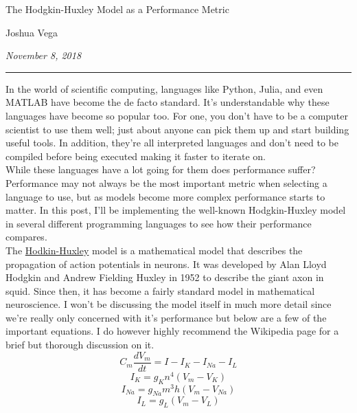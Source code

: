 \documentclass[12pt,letterpaper]{article}
\begin{document}
\begin{center}
  {\sc\Large The Hodgkin-Huxley Model as a Performance Metric\par}
  \vspace{1em}
  {\large Joshua Vega\par}
  \vspace{1em}
  {\it November 8, 2018\par}
\end{center}

\rule{\textwidth}{1pt}

\vspace{1.5em}

In the world of scientific computing, languages like Python, Julia, and even
MATLAB have become the de facto standard. It's understandable why these
languages have become so popular too. For one, you don't have to be a computer
scientist to use them well; just about anyone can pick them up and start
building useful tools. In addition, they're all interpreted languages and don't
need to be compiled before being executed making it faster to iterate on.\\

While these languages have a lot going for them does performance suffer?
Performance may not always be the most important metric when selecting a
language to use, but as models become more complex performance starts to matter.
In this post, I'll be implementing the well-known Hodgkin-Huxley model in
several different programming languages to see how their performance compares.\\

The
\href{https://en.wikipedia.org/wiki/Hodgkin-Huxley_model}{Hodkin-Huxley}
model is a mathematical model that describes the propagation of action
potentials in neurons. It was developed by Alan Lloyd Hodgkin and Andrew
Fielding Huxley in 1952 to describe the giant axon in squid. Since then, it has
become a fairly standard model in mathematical neuroscience. I won't be
discussing the model itself in much more detail since we're really only
concerned with it's performance but below are a few of the important
equations. I do however highly recommend the Wikipedia page for a brief but
thorough discussion on it.
\[C_m\frac{dV_m}{dt} = I - I_K - I_{Na} - I_L\]
\[I_K = g_Kn^4(V_m - V_K)\]
\[I_{Na} = g_{Na}m^3h(V_m - V_{Na})\]
\[I_L = g_L(V_m - V_L)\]
\end{document}

